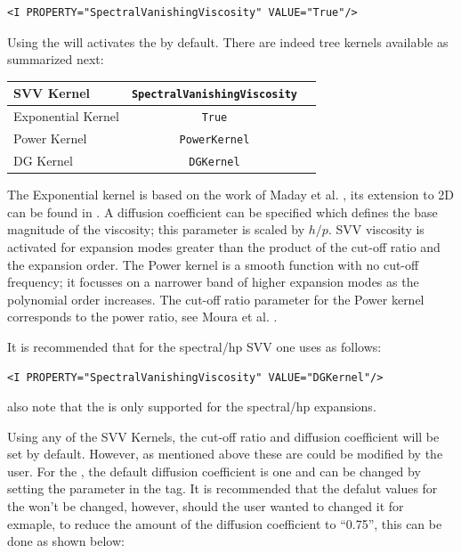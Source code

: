 \begin{lstlisting}[style=XMLStyle]
<I PROPERTY="SpectralVanishingViscosity" VALUE="True"/>
\end{lstlisting}
Using the  will activates the  by
default. There are indeed tree kernels available as summarized next:
\begin{center}
\footnotesize
\begin{tabular}{lcc}
\toprule
{SVV Kernel} & {\texttt{SpectralVanishingViscosity}} \\
\midrule
Exponential Kernel & \texttt{True} \\
Power Kernel & \texttt{PowerKernel} \\
DG Kernel & \texttt{DGKernel} \\
\bottomrule
\end{tabular}
\end{center}
The Exponential kernel is based on the work of Maday et al. \cite{yvsiouei93},
its extension to 2D can be found in \cite{rosh06}. A diffusion coefficient can
be specified which defines the base magnitude of the viscosity; this parameter
is scaled by $h/p$. SVV viscosity is activated for expansion modes greater than
the product of the cut-off ratio and the expansion order. The Power kernel is a
smooth function with no cut-off frequency; it focusses on a narrower band of
higher expansion modes as the polynomial order increases. The cut-off ratio
parameter for the Power kernel corresponds to the power ratio, see Moura et al.
\cite{rospjo16}. 

It is recommended that for the spectral/hp SVV one uses  as 
follows:

\begin{lstlisting}[style=XMLStyle]
<I PROPERTY="SpectralVanishingViscosity" VALUE="DGKernel"/>
\end{lstlisting}
also note that the  is only supported for the spectral/hp expansions.

Using any of the SVV Kernels, the cut-off ratio and diffusion coefficient 
will be set by default. However, as mentioned above these are could be modified 
by the user. 
For the , the default diffusion coefficient is one and can be
changed by setting the  parameter in the 
tag. It is recommended that the defalut values for the  won't be
changed, however, should the user wanted to changed it for exmaple, to reduce the
amount of the diffusion coefficient to ``0.75'', this can be done as shown below:

